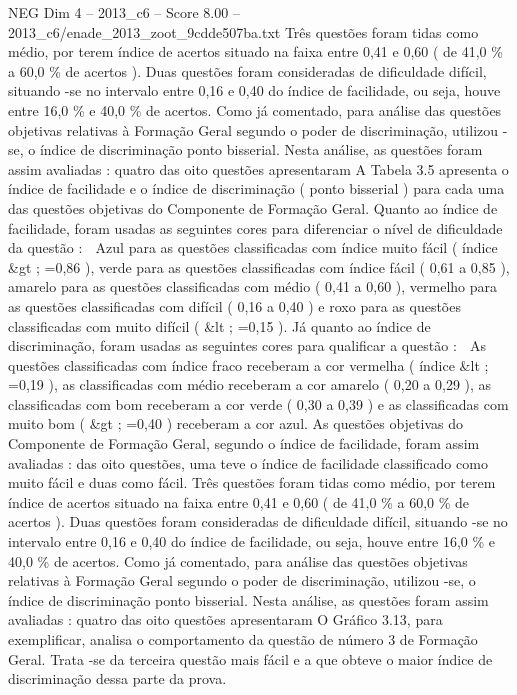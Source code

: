 \begin{textsample}{NEG Dim 4 – 2013\_c6 – Score 8.00 – 2013\_c6/enade\_2013\_zoot\_9cdde507ba.txt}
Três questões foram tidas como médio, por terem índice de acertos situado na faixa entre 0,41 e 0,60 ( de 41,0 \% a 60,0 \% de acertos ).
Duas questões foram consideradas de dificuldade difícil, situando -se no intervalo entre 0,16 e 0,40 do índice de facilidade, ou seja, houve entre 16,0 \% e 40,0 \% de acertos.
Como já comentado, para análise das questões objetivas relativas à Formação Geral segundo o poder de discriminação, utilizou -se, o índice de discriminação ponto bisserial.
Nesta análise, as questões foram assim avaliadas : quatro das oito questões apresentaram A Tabela 3.5 apresenta o índice de facilidade e o índice de discriminação ( ponto bisserial ) para cada uma das questões objetivas do Componente de Formação Geral.
Quanto ao índice de facilidade, foram usadas as seguintes cores para diferenciar o nível de dificuldade da questão :  Azul para as questões classificadas com índice muito fácil ( índice \&gt ; =0,86 ), verde para as questões classificadas com índice fácil ( 0,61 a 0,85 ), amarelo para as questões classificadas com médio ( 0,41 a 0,60 ), vermelho para as questões classificadas com difícil ( 0,16 a 0,40 ) e roxo para as questões classificadas com muito difícil ( \&lt ; =0,15 ).
Já quanto ao índice de discriminação, foram usadas as seguintes cores para qualificar a questão :  As questões classificadas com índice fraco receberam a cor vermelha ( índice \&lt ; =0,19 ), as classificadas com médio receberam a cor amarelo ( 0,20 a 0,29 ), as classificadas com bom receberam a cor verde ( 0,30 a 0,39 ) e as classificadas com muito bom ( \&gt ; =0,40 ) receberam a cor azul.
As questões objetivas do Componente de Formação Geral, segundo o índice de facilidade, foram assim avaliadas : das oito questões, uma teve o índice de facilidade classificado como muito fácil e duas como fácil.
Três questões foram tidas como médio, por terem índice de acertos situado na faixa entre 0,41 e 0,60 ( de 41,0 \% a 60,0 \% de acertos ).
Duas questões foram consideradas de dificuldade difícil, situando -se no intervalo entre 0,16 e 0,40 do índice de facilidade, ou seja, houve entre 16,0 \% e 40,0 \% de acertos.
Como já comentado, para análise das questões objetivas relativas à Formação Geral segundo o poder de discriminação, utilizou -se, o índice de discriminação ponto bisserial.
Nesta análise, as questões foram assim avaliadas : quatro das oito questões apresentaram O Gráfico 3.13, para exemplificar, analisa o comportamento da questão de número 3 de Formação Geral.
Trata -se da terceira questão mais fácil e a que obteve o maior índice de discriminação dessa parte da prova.

\end{textsample}

